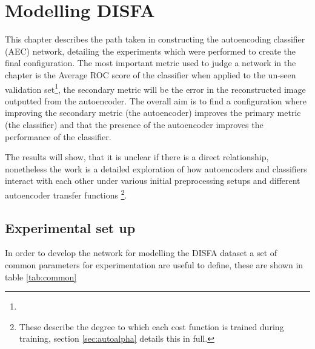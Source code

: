 \chapter{Modelling DISFA} \label{sec:model}
  This chapter describes the path taken in constructing the autoencoding classifier (AEC) network, detailing
  the experiments which were performed to create the final configuration.
  The most important metric used to judge a network in the chapter is the Average ROC score of the classifier
  when applied to the un-seen validation set\footnote{}, the secondary metric will be the error
  in the reconstructed image outputted from the autoencoder. The overall aim is to
  find a configuration where improving the secondary metric (the autoencoder) improves
  the primary metric (the classifier) and that the presence of the autoencoder improves
  the performance of the classifier.

  The results will show, that it is unclear if there is a direct relationship, nonetheless
  the work is a detailed exploration of how autoencoders and classifiers interact with each other
  under various initial preprocessing setups and different autoencoder transfer functions \footnote{These describe the degree to which
  each cost function is trained during training, section \ref{sec:autoalpha} details this in full.}.

  \section{Experimental set up}
    In order to develop the network for modelling the DISFA dataset a set of common
    parameters for experimentation are useful to define, these are shown in table \ref{tab:common}

